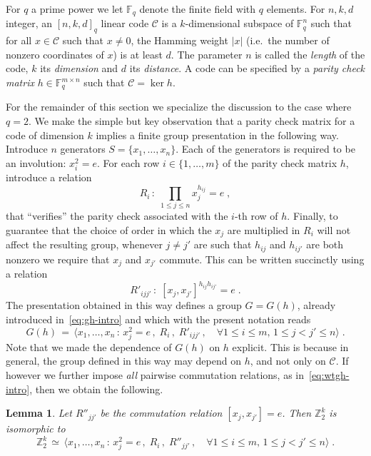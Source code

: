 \documentclass[11pt]{article}
\newtheorem{lemma}[theorem]{Lemma}
\theoremstyle{definition}
\newcommand{\code}{\mathscr{C}}
\newcommand{\F}{\ensuremath{\mathbb{F}}}
\newcommand{\Z}{\ensuremath{\mathbb{Z}}}
\begin{document}
\label{sec:pres-code}

For $q$ a prime power we let $\F_q$ denote the finite field with $q$ elements. 
For $n,k,d$ integer, an $[n,k,d]_q$ linear code $\code$ is a $k$-dimensional subspace of $\F_q^n$ such that for all $x\in \code$ such that $x\neq 0$, the Hamming weight $|x|$ (i.e.\ the number of nonzero coordinates of $x$) is at least $d$. The parameter $n$ is called the \emph{length} of the code, $k$ its \emph{dimension} and $d$ its \emph{distance}. A code can be specified by a \emph{parity check matrix} $h\in \F_q^{m\times n}$ such that $\code = \ker h$. 

For the remainder of this section we specialize the discussion to the case where $q=2$. 
We make the simple but key observation that a parity check matrix for a code of dimension $k$ implies a finite group presentation in the following way. Introduce $n$ generators $S=\{x_1,\ldots,x_n\}$. Each of the generators is required to be an involution: $x_i^2=e$. For each row $i\in \{1,\ldots,m\}$ of the parity check matrix $h$, introduce a relation 
\[ R_i\,:\; \prod_{1\leq j \leq n} x_j^{h_{ij}}=e\;, \]
that ``verifies'' the parity check associated with the $i$-th row of $h$. Finally, to guarantee that the choice of order in which the $x_j$ are multiplied in $R_i$ will not affect the resulting group, whenever $j\neq j'$ are such that $h_{ij}$ and $h_{ij'}$ are both nonzero we require that $x_j$ and $x_{j'}$ commute. This can be written succinctly using a relation 
\[ R'_{ijj'}\,:\; [x_j,x_{j'}]^{h_{ij} h_{ij'}}=e\;.\]
The presentation obtained in this way defines a group $G=G(h)$, already introduced in~\eqref{eq:gh-intro} and which with the present notation reads
\begin{equation}\label{eq:def-gh-pres}
 G(h) \,=\, \big\langle x_1,\ldots,x_n \,:\, x_j^2=e\,,\; R_i\,,\; R'_{ijj'}\,,\quad \forall 1\leq i\leq m,\, 1\leq j< j' \leq n\big\rangle\;.
\end{equation}
Note that we made the dependence of $G(h)$ on $h$ explicit. This is because in general, the group defined in this way may depend on $h$, and not only on $\code$. If however we further impose \emph{all} pairwise commutation relations, as in~\eqref{eq:wtgh-intro}, then we obtain the following. 

\begin{lemma}\label{lem:com-code}
Let $R''_{jj'}$ be the commutation relation $[x_j,x_{j'}]=e$. Then $\Z_2^k$ is isomorphic to 
\[ \Z_2^k \,\simeq\, \big\langle x_1,\ldots,x_n \,:\, x_j^2=e\,,\; R_i\,,\; R''_{jj'}\,,\quad \forall 1\leq i\leq m,\, 1\leq j< j' \leq n\big\rangle\;.\]
\end{lemma}
\end{document}
